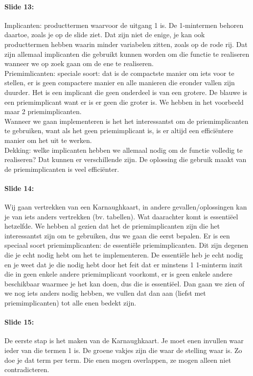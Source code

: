 \documentclass[10pt,a4paper]{book}
\begin{document}
\paragraph{Slide 13:} Implicanten: producttermen waarvoor de uitgang 1 is. De 1-mintermen behoren daartoe, zoals je op de slide ziet. Dat zijn niet de enige, je kan ook producttermen hebben waarin minder variabelen zitten, zoals op de rode rij. Dat zijn allemaal implicanten die gebruikt kunnen worden om die functie te realiseren wanneer we op zoek gaan om de ene te realiseren.\\
Priemimlicanten: speciale soort: dat is de compactste manier om iets voor te stellen, er is geen compactere manier en alle manieren die eronder vallen zijn duurder. Het is een implicant die geen onderdeel is van een grotere. De blauwe is een priemimplicant want er is er geen die groter is. We hebben in het voorbeeld maar 2 priemimplicanten. \\
Wanneer we gaan implementeren is het het interessantst om de priemimplicanten te gebruiken, want als het geen priemimplicant is, is er altijd een effici\"entere manier om het uit te werken.\\
Dekking: welke implicanten hebben we allemaal nodig om de functie volledig te realiseren? Dat kunnen er verschillende zijn. De oplossing die gebruik maakt van de priemimplicanten is veel effici\"enter.

\paragraph{Slide 14:} Wij gaan vertrekken van een Karnaughkaart, in andere gevallen/oplossingen kan je van iets anders vertrekken (bv. tabellen). Wat daarachter komt is essenti\"eel hetzelfde. We hebben al gezien dat het de priemimplicanten zijn die het interessantst zijn om te gebruiken, dus we gaan die eerst bepalen. Er is een speciaal soort priemimplicanten: de essenti\"ele priemimplicanten. Dit zijn degenen die je echt nodig hebt om het te implementeren. De essenti\"ele heb je echt nodig en je weet dat je die nodig hebt door het feit dat er minstens 1 1-minterm inzit die in geen enkele andere priemimplicant voorkomt, er is geen enkele andere beschikbaar waarmee je het kan doen, dus die is essenti\"eel. Dan gaan we zien of we nog iets anders nodig hebben, we vullen dat dan aan (liefst met priemimplicanten) tot alle enen bedekt zijn.

\paragraph{Slide 15:} De eerste stap is het maken van de Karnaughkaart. Je moet enen invullen waar ieder van die termen 1 is. De groene vakjes zijn die waar de stelling waar is. Zo doe je dat term per term. Die enen mogen overlappen, ze mogen alleen niet contradicteren.
\end{document}
